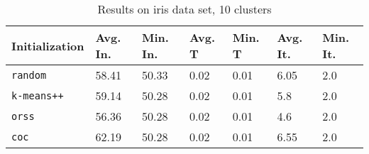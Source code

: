 \begin{table}[h]
	\begin{center}
		\begin{tabular}{|l|l|l|l|l|l|l|}
			\hline
			Initialization & Avg. In. & Min. In. & Avg. T & Min. T & Avg. It. & Min. It.\\\hline
			\texttt{random} & 58.41 & 50.33 & 0.02 & 0.01 & 6.05 & 2.0\\\hline
			\texttt{k-means++} & 59.14 & 50.28 & 0.02 & 0.01 & 5.8 & 2.0\\\hline
			\texttt{orss} & 56.36 & 50.28 & 0.02 & 0.01 & 4.6 & 2.0\\\hline
			\texttt{coc} & 62.19 & 50.28 & 0.02 & 0.01 & 6.55 & 2.0\\\hline
		\end{tabular}
		\caption{Results on iris data set, 10 clusters}
		\label{tbl:iris10}
	\end{center}
\end{table}

